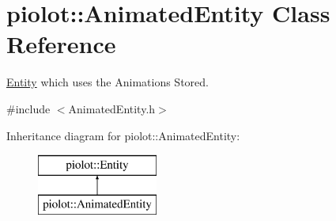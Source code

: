 \hypertarget{classpiolot_1_1_animated_entity}{}\section{piolot\+:\+:Animated\+Entity Class Reference}
\label{classpiolot_1_1_animated_entity}


\mbox{\hyperlink{classpiolot_1_1_entity}{Entity}} which uses the Animations Stored.  




{\ttfamily \#include $<$Animated\+Entity.\+h$>$}

Inheritance diagram for piolot\+:\+:Animated\+Entity\+:\begin{figure}[H]
\begin{center}
\leavevmode
\includegraphics[height=2.000000cm]{classpiolot_1_1_animated_entity}
\end{center}
\end{figure}
